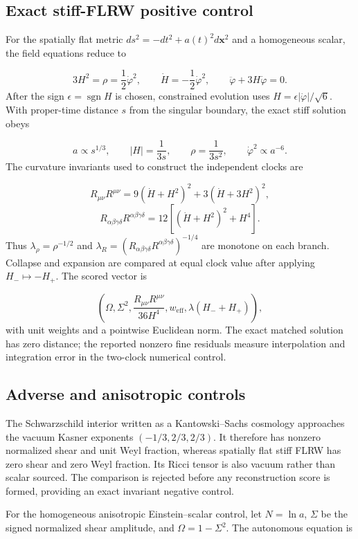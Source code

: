 \documentclass{iopjournal}
\begin{document}
\subsection{Exact stiff-FLRW positive control}
For the spatially flat metric $ds^2=-dt^2+a(t)^2d\mathbf{x}^2$ and a homogeneous scalar, the field equations reduce to

\[
3H^2=\rho=\frac12\dot\varphi^2,
\qquad
\dot H=-\frac12\dot\varphi^2,
\qquad
\ddot\varphi+3H\dot\varphi=0.
\]
After the sign $\epsilon=\operatorname{sgn}H$ is chosen, constrained evolution uses $H=\epsilon|\dot\varphi|/\sqrt6$. With proper-time distance $s$ from the singular boundary, the exact stiff solution obeys

\[
a\propto s^{1/3},\qquad |H|=\frac1{3s},\qquad
\rho=\frac1{3s^2},\qquad \dot\varphi^2\propto a^{-6}.
\]
The curvature invariants used to construct the independent clocks are

\[
R_{\mu\nu}R^{\mu\nu}
=9(\dot H+H^2)^2+3(\dot H+3H^2)^2,
\]
\[
R_{\alpha\beta\gamma\delta}R^{\alpha\beta\gamma\delta}
=12\left[(\dot H+H^2)^2+H^4\right].
\]
Thus $\lambda_\rho=\rho^{-1/2}$ and $\lambda_R=(R_{\alpha\beta\gamma\delta}R^{\alpha\beta\gamma\delta})^{-1/4}$ are monotone on each branch. Collapse and expansion are compared at equal clock value after applying $H_-\mapsto-H_+$. The scored vector is

\[
\left(\Omega,\Sigma^2,\frac{R_{\mu\nu}R^{\mu\nu}}{36H^4},
w_{\mathrm{eff}},\lambda(H_-+H_+)\right),
\]
with unit weights and a pointwise Euclidean norm. The exact matched solution has zero distance; the reported nonzero fine residuals measure interpolation and integration error in the two-clock numerical control.

\subsection{Adverse and anisotropic controls}
The Schwarzschild interior written as a Kantowski--Sachs cosmology approaches the vacuum Kasner exponents $(-1/3,2/3,2/3)$. It therefore has nonzero normalized shear and unit Weyl fraction, whereas spatially flat stiff FLRW has zero shear and zero Weyl fraction. Its Ricci tensor is also vacuum rather than scalar sourced. The comparison is rejected before any reconstruction score is formed, providing an exact invariant negative control.

For the homogeneous anisotropic Einstein--scalar control, let $N=\ln a$, $\Sigma$ be the signed normalized shear amplitude, and $\Omega=1-\Sigma^2$. The autonomous equation is
\end{document}
